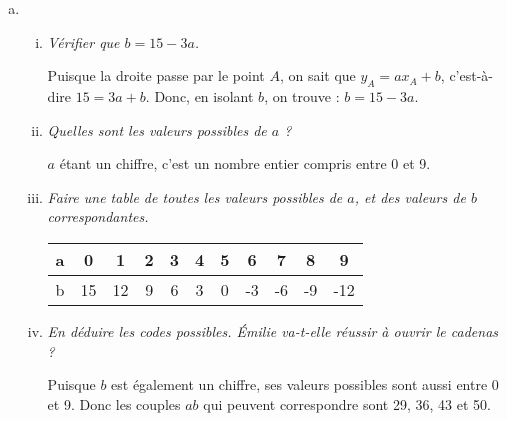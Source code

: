 \documentclass[11pt]{article}
\begin{document}
\begin{question}
  \begin{enumerate}[(a)]
    \item
      \begin{enumerate}[(i)]
        \item \emph{Vérifier que $b=15-3a$.}

          Puisque la droite passe par le point $A$, on sait que $y_A=ax_A+b$, c'est-à-dire $15=3a+b$. Donc, en isolant $b$, on trouve : $b=15-3a$.
        \item \emph{Quelles sont les valeurs possibles de $a$ ?}

          $a$ étant un chiffre, c'est un nombre entier compris entre 0 et 9.
        \item \emph{Faire une table de toutes les valeurs possibles
          de $a$, et des valeurs de $b$ correspondantes.}

          \begin{tabular}{c|cccccccccc}
            a & 0&1&2&3&4&5&6&7&8&9\\
            \hline
            b & 15&12&9&6&3&0&-3&-6&-9&-12\\
          \end{tabular}
        \item \emph{En déduire les codes possibles. Émilie
        va-t-elle réussir à ouvrir le cadenas ?}

        Puisque $b$ est également un chiffre, ses valeurs possibles sont aussi entre 0 et 9. Donc les couples $ab$ qui peuvent correspondre sont 29, 36, 43 et 50.


\end{enumerate}
\end{enumerate}
\end{question}
\end{document}
